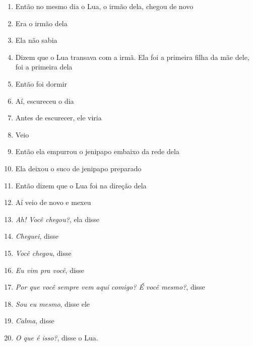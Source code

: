 \begin{enumerate}
\begin{center}\end{center}

\item Então no mesmo dia o Lua, o irmão dela, chegou de novo
\item Era o irmão dela
\item Ela não sabia
\item Dizem que o Lua transava com a irmã. Ela foi a primeira filha da mãe dele, foi a primeira dela
\item Então foi dormir

\begin{center}\end{center}

\item Aí, escureceu o dia
\item Antes de escurecer, ele viria
\item Veio
\item Então ela empurrou o jenipapo embaixo da rede dela
\item Ela deixou o suco de jenipapo preparado
\item Então dizem que o Lua foi na direção dela
\item Aí veio de novo e mexeu

\begin{center}\end{center}

\item \textit{Ah! Você chegou?}, ela disse
\item \textit{Cheguei}, disse
\item \textit{Você chegou}, disse
\item \textit{Eu vim pra você}, disse
\item \textit{Por que você sempre vem aqui comigo? É você mesmo?}, disse
\item \textit{Sou eu mesmo}, disse ele
\item \textit{Calma}, disse
\item \textit{O que é isso?}, disse o Lua.

\begin{center}\end{center}


\end{enumerate}
